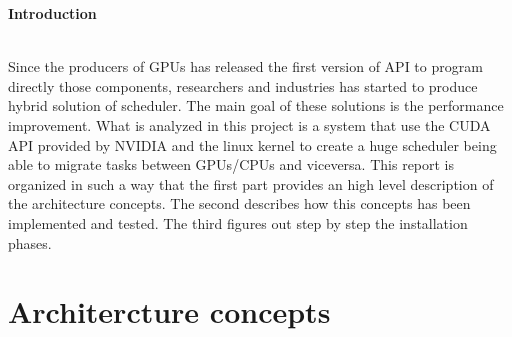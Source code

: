 \documentclass[a4paper,10pt]{article}
\newenvironment*{myabstract}{\begin{Large}\bf}{\end{Large}\\[2.5ex]}%
\begin{document}
\vspace{4ex}	%
\begin{multicols}{2}

\begin{myabstract} Introduction \end{myabstract}
Since the producers of GPUs has released the first version of API to program directly those 
components, researchers and industries has started to produce hybrid solution of scheduler. 
The main goal of these solutions is the performance improvement. What is analyzed in this project is 
a system that use the CUDA API provided by NVIDIA and the linux kernel to create a huge scheduler
being able to migrate tasks between GPUs/CPUs and viceversa. This report is organized in such a way
that the first part provides an high level description of the architecture concepts. The 
second describes how this concepts has been implemented and tested. The third figures out step by step
the installation phases. 




\section{Architercture concepts}


\end{multicols}
\end{document}
